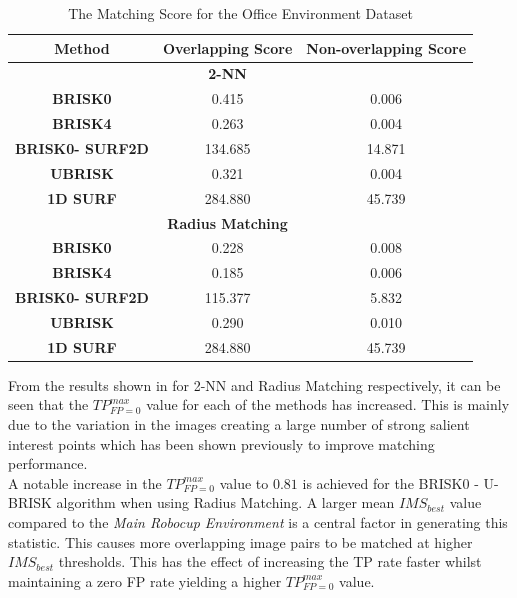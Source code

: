 \documentclass[11pt]{report}
\begin{document}
\begin{table}
\caption{The Matching Score for the Office Environment Dataset}
\begin{tabular}{|c|c|c|}
\hline 
\textbf{Method} & \textbf{Overlapping Score} & \textbf{Non-overlapping Score}\tabularnewline
\hline 
\hline 
 & \textbf{2-NN} & \tabularnewline
\hline 
\textbf{BRISK0} & 0.415 & 0.006\tabularnewline
\hline 
\textbf{BRISK4} & 0.263 & 0.004\tabularnewline
\hline 
\textbf{BRISK0- SURF2D} & 134.685 & 14.871\tabularnewline
\hline 
\textbf{UBRISK} & 0.321 & 0.004\tabularnewline
\hline 
\textbf{1D SURF} & 284.880 & 45.739\tabularnewline
\hline 
 & \textbf{Radius Matching} & \tabularnewline
\hline 
\textbf{BRISK0} & 0.228 & 0.008\tabularnewline
\hline 
\textbf{BRISK4} & 0.185 & 0.006\tabularnewline
\hline 
\textbf{BRISK0- SURF2D} & 115.377 & 5.832\tabularnewline
\hline 
\textbf{UBRISK} & 0.290 & 0.010\tabularnewline
\hline 
\textbf{1D SURF} & 284.880 & 45.739\tabularnewline
\hline 
\end{tabular}
\label{tab:oeMS}
\end{table}




From the results shown in  for 2-NN and Radius Matching respectively, it can be seen that the $TP_{FP=0}^{max}$ value for each of the methods has increased. This is mainly due to the variation in the images creating a large number of strong salient interest points which has been shown previously to improve matching performance.\\

A notable increase in the $TP_{FP=0}^{max}$ value to $0.81$ is achieved for the BRISK0 - U-BRISK algorithm when using Radius Matching. A larger mean $IMS_{best}$ value compared to the \textit{Main Robocup Environment} is a central factor in generating this statistic. This causes more overlapping image pairs to be matched at higher $IMS_{best}$ thresholds. This has the effect of increasing the TP rate faster whilst maintaining a zero FP rate yielding a higher $TP_{FP=0}^{max}$ value.\\
\end{document}
